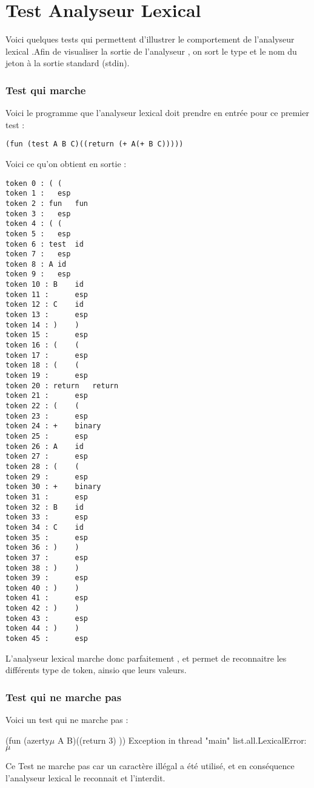 \section{Test Analyseur Lexical}

Voici quelques tests qui permettent d'illustrer le comportement de l'analyseur lexical .Afin de visualiser la sortie de l'analyseur , on sort le type et le nom du jeton à la sortie standard (stdin).

\subsubsection{Test qui marche}
Voici le programme que l'analyseur lexical doit prendre en entrée pour ce premier test :
\begin{verbatim}
(fun (test A B C)((return (+ A(+ B C)))))
\end{verbatim}
Voici ce qu'on obtient en sortie :
\begin{verbatim}
token 0 : (	(
token 1 :  	esp
token 2 : fun	fun
token 3 :  	esp
token 4 : (	(
token 5 :  	esp
token 6 : test	id
token 7 :  	esp
token 8 : A	id
token 9 :  	esp
token 10 : B	id
token 11 :  	esp
token 12 : C	id
token 13 :  	esp
token 14 : )	)
token 15 :  	esp
token 16 : (	(
token 17 :  	esp
token 18 : (	(
token 19 :  	esp
token 20 : return	return
token 21 :  	esp
token 22 : (	(
token 23 :  	esp
token 24 : +	binary
token 25 :  	esp
token 26 : A	id
token 27 :  	esp
token 28 : (	(
token 29 :  	esp
token 30 : +	binary
token 31 :  	esp
token 32 : B	id
token 33 :  	esp
token 34 : C	id
token 35 :  	esp
token 36 : )	)
token 37 :  	esp
token 38 : )	)
token 39 :  	esp
token 40 : )	)
token 41 :  	esp
token 42 : )	)
token 43 :  	esp
token 44 : )	)
token 45 :  	esp
\end{verbatim}

L'analyseur lexical marche donc parfaitement , et permet de reconnaitre les différents type de token, ainsio que leurs valeurs.

\subsubsection{Test qui ne marche pas}

Voici un test qui ne marche pas :

(fun (azerty$\mu$ A B)((return 3) ))
Exception in thread "main" list.all.LexicalError: $\mu$


Ce Test ne marche pas car un caractère illégal a été utilisé, et en conséquence l'analyseur lexical le reconnait et l'interdit.

